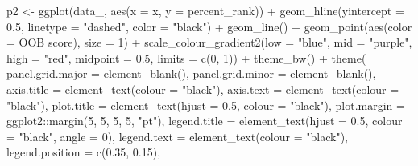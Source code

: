 \documentclass[
  11pt,
  oneside]{book}
\newenvironment{Shaded}{\begin{snugshade}}{\end{snugshade}}
\newcommand{\AttributeTok}[1]{\textcolor[rgb]{0.77,0.63,0.00}{#1}}
\newcommand{\DecValTok}[1]{\textcolor[rgb]{0.00,0.00,0.81}{#1}}
\newcommand{\FloatTok}[1]{\textcolor[rgb]{0.00,0.00,0.81}{#1}}
\newcommand{\FunctionTok}[1]{\textcolor[rgb]{0.00,0.00,0.00}{#1}}
\newcommand{\NormalTok}[1]{#1}
\newcommand{\OtherTok}[1]{\textcolor[rgb]{0.56,0.35,0.01}{#1}}
\newcommand{\SpecialCharTok}[1]{\textcolor[rgb]{0.00,0.00,0.00}{#1}}
\newcommand{\StringTok}[1]{\textcolor[rgb]{0.31,0.60,0.02}{#1}}
\begin{document}
\begin{Shaded}
\begin{Highlighting}[]
\NormalTok{p2 }\OtherTok{\textless{}{-}} \FunctionTok{ggplot}\NormalTok{(data\_, }\FunctionTok{aes}\NormalTok{(}\AttributeTok{x =}\NormalTok{ x, }\AttributeTok{y =} \StringTok{\textasciigrave{}}\AttributeTok{percent\_rank}\StringTok{\textasciigrave{}}\NormalTok{)) }\SpecialCharTok{+}
  \FunctionTok{geom\_hline}\NormalTok{(}\AttributeTok{yintercept =} \FloatTok{0.5}\NormalTok{, }\AttributeTok{linetype =} \StringTok{"dashed"}\NormalTok{, }\AttributeTok{color =} \StringTok{"black"}\NormalTok{) }\SpecialCharTok{+}
  \FunctionTok{geom\_line}\NormalTok{() }\SpecialCharTok{+}
  \FunctionTok{geom\_point}\NormalTok{(}\FunctionTok{aes}\NormalTok{(}\AttributeTok{color =} \StringTok{\textasciigrave{}}\AttributeTok{OOB score}\StringTok{\textasciigrave{}}\NormalTok{), }\AttributeTok{size =} \DecValTok{1}\NormalTok{) }\SpecialCharTok{+}
  \FunctionTok{scale\_colour\_gradient2}\NormalTok{(}\AttributeTok{low =} \StringTok{"blue"}\NormalTok{, }\AttributeTok{mid =} \StringTok{"purple"}\NormalTok{, }\AttributeTok{high =} \StringTok{"red"}\NormalTok{, }\AttributeTok{midpoint =} \FloatTok{0.5}\NormalTok{, }\AttributeTok{limits =} \FunctionTok{c}\NormalTok{(}\DecValTok{0}\NormalTok{, }\DecValTok{1}\NormalTok{)) }\SpecialCharTok{+}
  \FunctionTok{theme\_bw}\NormalTok{() }\SpecialCharTok{+}
  \FunctionTok{theme}\NormalTok{(}
    \AttributeTok{panel.grid.major =} \FunctionTok{element\_blank}\NormalTok{(),}
    \AttributeTok{panel.grid.minor =} \FunctionTok{element\_blank}\NormalTok{(),}
    \AttributeTok{axis.title =} \FunctionTok{element\_text}\NormalTok{(}\AttributeTok{colour =} \StringTok{"black"}\NormalTok{),}
    \AttributeTok{axis.text =} \FunctionTok{element\_text}\NormalTok{(}\AttributeTok{colour =} \StringTok{"black"}\NormalTok{),}
    \AttributeTok{plot.title =} \FunctionTok{element\_text}\NormalTok{(}\AttributeTok{hjust =} \FloatTok{0.5}\NormalTok{, }\AttributeTok{colour =} \StringTok{"black"}\NormalTok{),}
    \AttributeTok{plot.margin =}\NormalTok{ ggplot2}\SpecialCharTok{::}\FunctionTok{margin}\NormalTok{(}\DecValTok{5}\NormalTok{, }\DecValTok{5}\NormalTok{, }\DecValTok{5}\NormalTok{, }\DecValTok{5}\NormalTok{, }\StringTok{"pt"}\NormalTok{),}
    \AttributeTok{legend.title =} \FunctionTok{element\_text}\NormalTok{(}\AttributeTok{hjust =} \FloatTok{0.5}\NormalTok{, }\AttributeTok{colour =} \StringTok{"black"}\NormalTok{, }\AttributeTok{angle =} \DecValTok{0}\NormalTok{),}
    \AttributeTok{legend.text =} \FunctionTok{element\_text}\NormalTok{(}\AttributeTok{colour =} \StringTok{"black"}\NormalTok{),}
    \AttributeTok{legend.position =} \FunctionTok{c}\NormalTok{(}\FloatTok{0.35}\NormalTok{, }\FloatTok{0.15}\NormalTok{),}

\end{Highlighting}
\end{Shaded}
\end{document}
